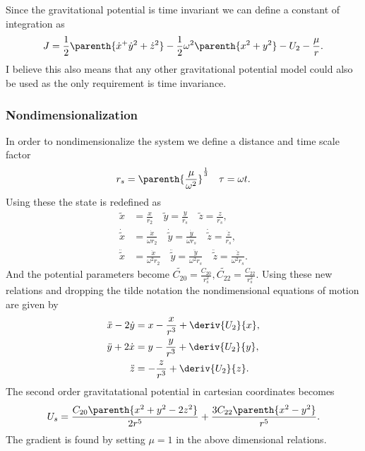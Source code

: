 \documentclass[11pt, reqno]{article}   	%
\begin{document}
Since the gravitational potential is time invariant we can define a constant of integration as
\begin{align*}
	J = \frac{1}{2} \parenth{\dot{x}^ + \dot{y}^2 + \dot{z}^2} - \frac{1}{2} \omega^2 \parenth{x^2 + y^2} - U_2 - \frac{\mu}{r} .
\end{align*}
I believe this also means that any other gravitational potential model could also be used as the only requirement is time invariance.

\subsubsection*{Nondimensionalization}
In order to nondimensionalize the system we define a distance and time scale factor
\begin{align*}
	r_s = \parenth{\frac{\mu}{\omega^2}}^{\frac{1}{3}} \quad \tau = \omega t .	
\end{align*}
Using these the state is redefined as
\begin{align*}
	\tilde{x} &= \frac{x}{r_2} \quad \tilde{y} = \frac{y}{r_s} \quad \tilde{z} = \frac{z}{r_s}, \\
	\dot{\tilde{x}} &= \frac{\dot{x}}{\omega r_2} \quad \dot{\tilde{y}} = \frac{\dot{y}}{\omega r_s} \quad \dot{\tilde{z}} = \frac{\dot{z}}{r_s},\\
	\ddot{\tilde{x}} &= \frac{\ddot{x}}{\omega^2 r_2} \quad \ddot{\tilde{y}} = \frac{\ddot{y}}{\omega^2 r_s} \quad \ddot{\tilde{z}} = \frac{\ddot{z}}{\omega^2 r_s} .
\end{align*}
And the potential parameters become \( \tilde{C_{20}} = \frac{C_{20}}{r_s^2}, \tilde{C_{22}} = \frac{C_{22}}{r_s^2} \).
Using these new relations and dropping the tilde notation the nondimensional equations of motion are given by
\begin{align*}
	\ddot{x} - 2 \dot{y} &= x - \frac{x}{r^3} + \deriv{U_2}{x}, \\
	\ddot{y} + 2 \dot{x} &=  y - \frac{y}{r^3} + \deriv{U_2}{y}, \\
	\ddot{z} &= -\frac{z}{r^3} + \deriv{U_2}{z} .
\end{align*}
The second order gravitatational potential in cartesian coordinates becomes
\begin{align*}
	U_s = \frac{C_{20} \parenth{x^2+y^2-2z^2}}{2 r^5} + \frac{3 C_{22} \parenth{x^2 - y^2}}{r^5} .
\end{align*}
The gradient is found by setting \( \mu =1 \) in the above dimensional relations.
\end{document}
